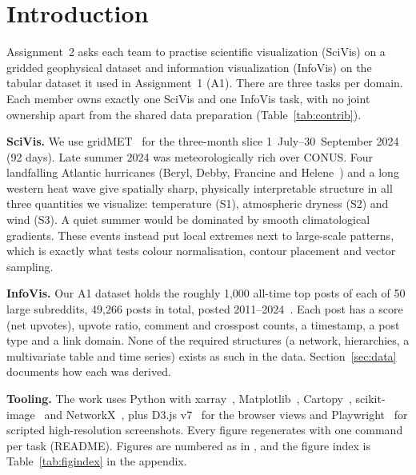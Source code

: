 \section{Introduction}
\label{sec:intro}
Assignment~2 asks each team to practise scientific visualization (SciVis) on a gridded geophysical dataset and
information visualization (InfoVis) on the tabular dataset it used in Assignment~1 (A1). There are three tasks per
domain. Each member owns exactly one SciVis and one InfoVis task, with no joint ownership apart from the shared data
preparation (Table~\ref{tab:contrib}).

\textbf{SciVis.} We use gridMET~\cite{abatzoglou2013,gridmet_site} for the three-month slice 1~July--30~September 2024
(92 days). %
Late summer 2024 was meteorologically rich over CONUS. Four landfalling Atlantic hurricanes (Beryl, Debby, Francine and
Helene~\cite{nhc_tcr}) and a long western heat wave give spatially sharp, physically interpretable structure in all
three quantities we visualize: temperature (S1), atmospheric dryness (S2) and wind (S3). A quiet summer would be dominated
by smooth climatological gradients. These events instead put local extremes next to large-scale patterns, which is
exactly what tests colour normalisation, contour placement and vector sampling.

\textbf{InfoVis.} Our A1 dataset holds the roughly 1,000 all-time top posts of each of 50 large subreddits, 49,266 posts in
total, posted 2011--2024~\cite{kaggle_reddit}. Each post has a score (net upvotes), upvote ratio, comment and crosspost
counts, a timestamp, a post type and a link domain. None of the required structures (a network, hierarchies, a
multivariate table and time series) exists as such in the data. Section~\ref{sec:data} documents how each was derived.

\textbf{Tooling.} The work uses Python with xarray~\cite{hoyer2017}, Matplotlib~\cite{hunter2007}, Cartopy~\cite{cartopy},
scikit-image~\cite{vanderwalt2014} and NetworkX~\cite{hagberg2008}, plus D3.js v7~\cite{bostock2011} for the
browser views and Playwright~\cite{playwright} for scripted high-resolution screenshots. Every figure regenerates with one
command per task (README). Figures are numbered as in , and the figure index is
Table~\ref{tab:figindex} in the appendix.

